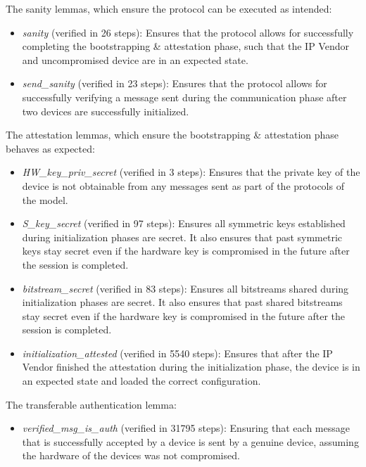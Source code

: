 The sanity lemmas, which ensure the protocol can be executed as intended:
\begin{itemize}

\item \emph{sanity} (verified in 26 steps): Ensures that the protocol allows for successfully completing the bootstrapping \& attestation phase, such that the IP Vendor and uncompromised \projecttitle{} device are in an expected state.
\item \emph{send\_sanity} (verified in 23 steps):  Ensures that the protocol allows for successfully verifying a message sent during the communication phase after two \projecttitle{} devices are successfully initialized. 

\end{itemize}
The attestation lemmas, which ensure the bootstrapping \& attestation phase behaves as expected:
\begin{itemize}

\item \emph{HW\_key\_priv\_secret} (verified in 3 steps): Ensures that the private key of the \projecttitle{} device is not obtainable from any messages sent as part of the \projecttitle{} protocols of the model. 
\item \emph{S\_key\_secret} (verified in 97 steps): Ensures all symmetric keys established during initialization phases are secret. It also ensures that past symmetric keys stay secret even if the hardware key is compromised in the future after the session is completed.
\item \emph{bitstream\_secret} (verified in 83 steps): Ensures all bitstreams shared during initialization phases are secret. It also ensures that past shared bitstreams stay secret even if the hardware key is compromised in the future after the session is completed.
\item \emph{initialization\_attested} (verified in 5540 steps): Ensures that after the IP Vendor finished the attestation during the initialization phase, the \projecttitle{} device is in an expected state and loaded the correct configuration.

\end{itemize}
The transferable authentication lemma:
\begin{itemize}

\item \emph{verified\_msg\_is\_auth} (verified in 31795 steps): Ensuring that each message that is successfully accepted by a \projecttitle{} device is sent by a genuine \projecttitle{} device, assuming
the hardware of the \projecttitle{} devices was not compromised.

\end{itemize}
